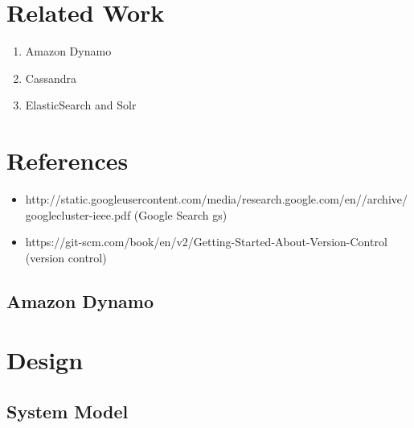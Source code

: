 \documentclass[a4paper, 11pt]{article}
\begin{document}
\section{Related Work}

\begin{enumerate}
	\item Amazon Dynamo
	\item Cassandra
	\item ElasticSearch and Solr
\end{enumerate}



\section{References}

\begin{itemize}

\item http://static.googleusercontent.com/media/research.google.com/en//archive/googlecluster-ieee.pdf (Google Search gs)

\item 
https://git-scm.com/book/en/v2/Getting-Started-About-Version-Control (version control)


\end{itemize}

\subsection*{Amazon Dynamo}




\newpage
\section{Design}


\subsection{System Model}
\end{document}
